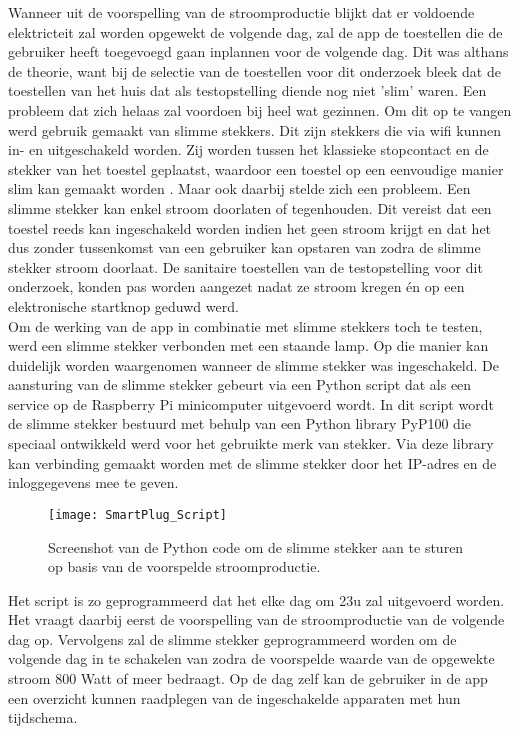 Wanneer uit de voorspelling van de stroomproductie blijkt dat er voldoende elektricteit zal worden opgewekt de volgende dag, zal de app de toestellen die de gebruiker heeft toegevoegd gaan inplannen voor de volgende dag. Dit was althans de theorie, want bij de selectie van de toestellen voor dit onderzoek bleek dat de toestellen van het huis dat als testopstelling diende nog niet 'slim' waren. Een probleem dat zich helaas zal voordoen bij heel wat gezinnen. Om dit op te vangen werd gebruik gemaakt van slimme stekkers. Dit zijn stekkers die via wifi kunnen in- en uitgeschakeld worden. Zij worden tussen het klassieke stopcontact en de stekker van het toestel geplaatst, waardoor een toestel op een eenvoudige manier slim kan gemaakt worden \autocite{Jong2020}. Maar ook daarbij stelde zich een probleem. Een slimme stekker kan enkel stroom doorlaten of tegenhouden. Dit vereist dat een toestel reeds kan ingeschakeld worden indien het geen stroom krijgt en dat het dus zonder tussenkomst van een gebruiker kan opstaren van zodra de slimme stekker stroom doorlaat. De sanitaire toestellen van de testopstelling voor dit onderzoek, konden pas worden aangezet nadat ze stroom kregen én op een elektronische startknop geduwd werd. \\

Om de werking van de app in combinatie met slimme stekkers toch te testen, werd een slimme stekker verbonden met een staande lamp. Op die manier kan duidelijk worden waargenomen wanneer de slimme stekker was ingeschakeld. De aansturing van de slimme stekker gebeurt via een Python script dat als een service op de Raspberry Pi minicomputer uitgevoerd wordt. In dit script wordt de slimme stekker bestuurd met behulp van een Python library PyP100 die speciaal ontwikkeld werd voor het gebruikte merk van stekker. Via deze library kan verbinding gemaakt worden met de slimme stekker door het IP-adres en de inloggegevens mee te geven. 

\begin{figure}[h!]
    \centering\texttt{[image: SmartPlug\_Script]}
    \caption{\label{fig:SmartPlug_Script}Screenshot van de Python code om de slimme stekker aan te sturen op basis van de voorspelde stroomproductie.}
\end{figure} 

Het script is zo geprogrammeerd dat het elke dag om 23u zal uitgevoerd worden. Het vraagt daarbij eerst de voorspelling van de stroomproductie van de volgende dag op. Vervolgens zal de slimme stekker geprogrammeerd worden om de volgende dag in te schakelen van zodra de voorspelde waarde van de opgewekte stroom 800 Watt of meer bedraagt. Op de dag zelf kan de gebruiker in de app een overzicht kunnen raadplegen van de ingeschakelde apparaten met hun tijdschema.